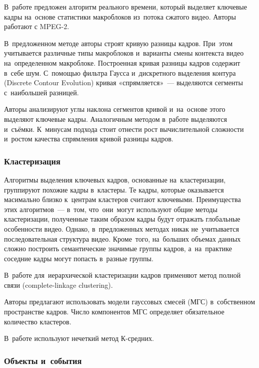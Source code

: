 В~работе \cite{Calic:2002} предложен алгоритм реального времени,
который выделяет ключевые кадры на~основе статистики макроблоков
из~потока сжатого видео. Авторы работают с  MPEG-2.

В~предложенном методе авторы строят кривую разницы кадров.
При~этом учитывается различные типы макроблоков
и~варианты смены контекста видео на~определенном макроблоке.
Построенная кривая разницы кадров содержит в~себе шум.
С~помощью фильтра Гаусса
и~дискретного выделения контура (Discrete Contour Evolution)
кривая «спрямляется»~— выделяются сегменты с~наибольшей разницей.

Авторы анализируют углы наклона сегментов кривой
и~на~основе этого выделяют ключевые кадры.
Аналогичным методом в~работе выделяются и~съёмки.
К~минусам подхода стоит отнести рост вычислительной сложности
и~ростом качества спрямления кривой разницы кадров.


\subsubsection{Кластеризация}

Алгоритмы выделения ключевых кадров, основанные на~кластеризации,
группируют похожие кадры в~кластеры.
Те кадры, которые оказывается масимально близко к~центрам кластеров
считают ключевыми.
Преимущества этих алгоритмов~— в~том, что~они~могут используют общие методы
кластеризации, полученные таким образом кадры будут
отражать глобальные особенности видео.
Однако, в~предложенных методах никак не~учитывается последовательная
структура видео. Кроме~того, на~больших объемах данных сложно построить
семантические значимые группы кадров,
а~на~практике соседние кадры могут попасть в~разные группы.

В~работе \cite{Girgensohn:2000} для~иерархической
кластеризации кадров
применяют метод полной связи
(complete-linkage clustering).

Авторы \cite{Liu:2003} предлагают использовать модели гауссовых смесей (МГС)
в~собственном пространстве кадров. Число компонентов
МГС определяет обязательное количество кластеров.

В~работе \cite{Wang:2007} используют нечеткий метод К-средних.


\subsubsection{Объекты и~события}

